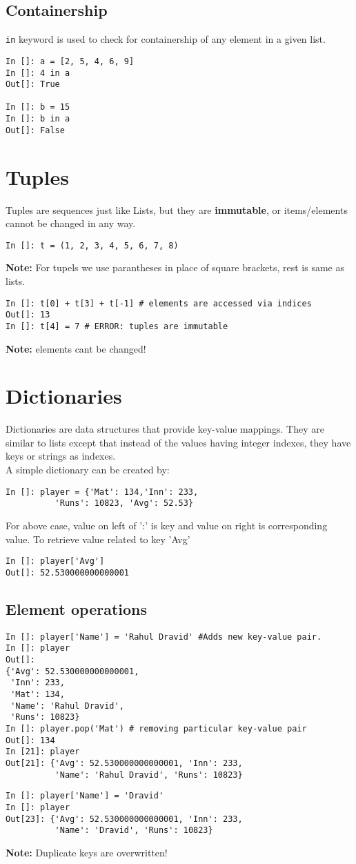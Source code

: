 \documentclass[12pt]{article}
\newcommand{\typ}[1]{\lstinline{#1}}
\begin{document}
\subsection{Containership}
\typ{in} keyword is used to check for containership of any element in a given list.
\begin{lstlisting}
In []: a = [2, 5, 4, 6, 9]
In []: 4 in a
Out[]: True

In []: b = 15
In []: b in a
Out[]: False
\end{lstlisting}
\section{Tuples}
Tuples are sequences just like Lists, but they are \textbf{immutable}, or items/elements cannot be changed in any way.
\begin{lstlisting}
In []: t = (1, 2, 3, 4, 5, 6, 7, 8) 
\end{lstlisting}
\textbf{Note:} For tupels we use parantheses in place of square brackets, rest is same as lists.
\begin{lstlisting}
In []: t[0] + t[3] + t[-1] # elements are accessed via indices
Out[]: 13
In []: t[4] = 7 # ERROR: tuples are immutable
\end{lstlisting}
\textbf{Note:} elements cant be changed!
\section{Dictionaries}
Dictionaries are data structures that provide key-value mappings. They are similar to lists except that instead of the values having integer indexes, they have keys or strings as indexes.\\
A simple dictionary can be created by:
\begin{lstlisting}
In []: player = {'Mat': 134,'Inn': 233,
          'Runs': 10823, 'Avg': 52.53}
\end{lstlisting}
For above case, value on left of ':' is key and value on right is corresponding value. To retrieve value related to key 'Avg'
\begin{lstlisting}
In []: player['Avg']
Out[]: 52.530000000000001
\end{lstlisting}
\subsection{Element operations}
\begin{lstlisting}
In []: player['Name'] = 'Rahul Dravid' #Adds new key-value pair.
In []: player
Out[]: 
{'Avg': 52.530000000000001,
 'Inn': 233,
 'Mat': 134,
 'Name': 'Rahul Dravid',
 'Runs': 10823}
In []: player.pop('Mat') # removing particular key-value pair
Out[]: 134
In [21]: player
Out[21]: {'Avg': 52.530000000000001, 'Inn': 233, 
          'Name': 'Rahul Dravid', 'Runs': 10823}
\end{lstlisting}
\begin{lstlisting}
In []: player['Name'] = 'Dravid'
In []: player
Out[23]: {'Avg': 52.530000000000001, 'Inn': 233, 
          'Name': 'Dravid', 'Runs': 10823}
\end{lstlisting}
\textbf{Note:} Duplicate keys are overwritten!
\end{document}
